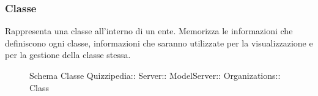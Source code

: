 \subsubsection{Classe }
Rappresenta una classe all'interno di un ente. Memorizza le informazioni che definiscono ogni classe,
informazioni che saranno utilizzate per la visualizzazione e per la gestione della classe stessa.
\begin{figure}[H]
\centering
\noindent{}
\caption[Schema Classe Class]{Schema Classe Quizzipedia:: Server:: ModelServer:: Organizations:: Class}
\end{figure}
